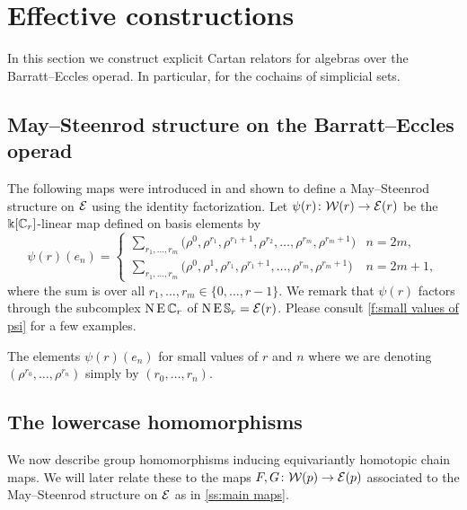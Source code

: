 
\section{Effective constructions}

In this section we construct explicit Cartan relators for algebras over the Barratt--Eccles operad.
In particular, for the cochains of simplicial sets.

\subsection{May--Steenrod structure on the Barratt--Eccles operad}

The following maps were introduced in \cite{medina2021may_st} and shown to define a May--Steenrod structure on $\mathcal{E}$ using the identity factorization.
Let $\psi(r) \colon \mathcal{W}(r) \to \mathcal{E}(r)$ be the $\Bbbk[\mathbb{C}_r]$-linear map defined on basis elements by
\begin{equation*}
	\psi(r)(e_{n}) = \begin{cases}
		\displaystyle{\sum_{r_1, \dots, r_m}} \big(\rho^0, \rho^{r_1}, \rho^{r_1+1}, \rho^{r_2}, \dots, \rho^{r_{m}}, \rho^{r_{m}+1} \big) & n = 2m, \\
		\displaystyle{\sum_{r_1, \dots, r_m}} \big(\rho^0, \rho^1, \rho^{r_1}, \rho^{r_1+1}, \dots, \rho^{r_{m}}, \rho^{r_{m}+1} \big) & n = 2m+1,
	\end{cases}
\end{equation*}
where the sum is over all $r_1, \dots, r_m \in \{0, \dots, r-1\}$.
We remark that $\psi(r)$ factors through the subcomplex $\operatorname{N}\operatorname{E}\mathbb{C}_r$ of $\operatorname{N}\operatorname{E}\mathbb{S}_r = \mathcal{E}(r)$.
Please consult \cref{f:small values of psi} for a few examples.

\begin{table}
	\centering
	
	\caption{The elements $\psi(r)(e_n)$ for small values of $r$ and $n$ where we are denoting $(\rho^{r_0}, \dots, \rho^{r_n})$ simply by $(r_0, \dots, r_n)$.}
	\label{f:small values of psi}
\end{table}

\subsection{The lowercase homomorphisms}

We now describe group homomorphisms inducing equivariantly homotopic chain maps.
We will later relate these to the maps $F,G \colon \mathcal{W}(p) \to \mathcal{E}(p)$ associated to the May--Steenrod structure on $\mathcal{E}$ as in \cref{ss:main maps}.

